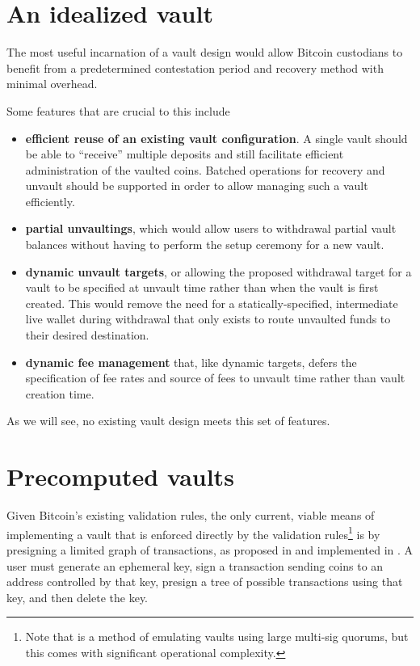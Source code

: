 \documentclass[10pt]{article}
\begin{document}
\section*{An idealized vault}

The most useful incarnation of a vault design would allow Bitcoin custodians to
benefit from a predetermined contestation period and recovery method with minimal
overhead. 

Some features that are crucial to this include

\begin{itemize}
  \item \textbf{efficient reuse of an existing vault configuration}. A single vault
    \spk{} should be able to ``receive'' multiple deposits and still facilitate
    efficient administration of the vaulted coins. Batched operations for recovery and
    unvault should be supported in order to allow managing such a vault efficiently.

  \item \textbf{partial unvaultings}, which would allow users to withdrawal partial vault
    balances without having to perform the setup ceremony for a new vault.

  \item \textbf{dynamic unvault targets}, or allowing the proposed withdrawal target
    for a vault to be specified at unvault time rather than when the vault is first
    created. This would remove the need for a statically-specified, intermediate live
    wallet during withdrawal that only exists to route unvaulted funds to their desired
    destination. 

  \item \textbf{dynamic fee management} that, like dynamic targets, defers the
    specification of fee rates and source of fees to
    unvault time rather than vault creation time.
\end{itemize}

As we will see, no existing vault design meets this set of features.

\section*{Precomputed vaults}

Given Bitcoin's existing validation rules, the only current, viable means of
implementing a vault that is enforced directly by the validation rules\footnote{Note
that \cite{Revault} is a method of emulating vaults using large multi-sig quorums, but
this comes with significant operational complexity.} is by presigning a limited graph
of transactions, as proposed in \cite{Bishop} and implemented in \cite{BishopCode}. A user must generate an ephemeral key,
sign a transaction sending coins to an address controlled by that key, presign a
tree of possible transactions using that key, and then delete the key. 
\end{document}
